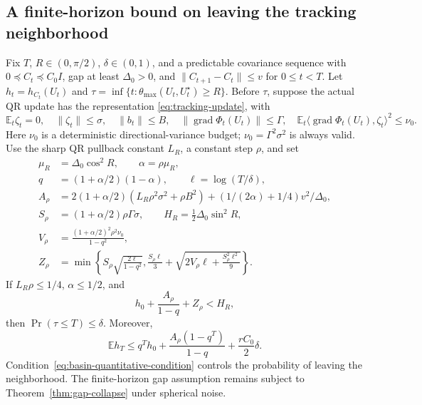 \subsection{A finite-horizon bound on leaving the tracking neighborhood}
\label{app:basin-exit}

\begin{theorem}
\label{thm:basin-certificate}
Fix $T$, $R\in(0,\pi/2)$, $\delta\in(0,1)$, and a predictable covariance sequence with
$0\preceq C_t\preceq C_0I$, gap at least $\Delta_0>0$, and
$\|C_{t+1}-C_t\|\le v$ for $0\le t<T$.
Let $h_t=h_{C_t}(U_t)$ and
$\tau=\inf\{t:\theta_{\max}(U_t,U_t^\star)\ge R\}$.
Before $\tau$, suppose the actual QR update has the representation
\eqref{eq:tracking-update}, with
\begin{equation}
 \mathbb E_t\zeta_t=0,\quad\|\zeta_t\|\le\sigma,\quad
 \|b_t\|\le B,\quad\|\operatorname{grad}\Phi_t(U_t)\|\le\Gamma,\quad
 \mathbb E_t\langle\operatorname{grad}\Phi_t(U_t),\zeta_t\rangle^2\le\nu_0.
\end{equation}
Here $\nu_0$ is a deterministic directional-variance budget;
$\nu_0=\Gamma^2\sigma^2$ is always valid.
Use the sharp QR pullback constant $L_R$, a constant step $\rho$, and set
\begin{align}
 \mu_R&=\Delta_0\cos^2R,\qquad\alpha=\rho\mu_R,\\
 q&=(1+\alpha/2)(1-\alpha),\qquad\ell=\log(T/\delta),\\
 A_\rho&=2(1+\alpha/2)(L_R\rho^2\sigma^2+\rho B^2)
                +(1/(2\alpha)+1/4)v^2/\Delta_0,\\
 S_\rho&=(1+\alpha/2)\rho\Gamma\sigma,\qquad
 H_R=\tfrac12\Delta_0\sin^2R,\\
 V_\rho&=\frac{(1+\alpha/2)^2\rho^2\nu_0}{1-q^2},\\
 Z_\rho&=\min\left\{S_\rho\sqrt{\frac{2\ell}{1-q^2}},
 \frac{S_\rho\ell}{3}+\sqrt{2V_\rho\ell+\frac{S_\rho^2\ell^2}{9}}\right\}.
\end{align}
If $L_R\rho\le1/4$, $\alpha\le1/2$, and
\begin{equation}
 h_0+\frac{A_\rho}{1-q}
  +Z_\rho<H_R,
 \label{eq:basin-quantitative-condition}
\end{equation}
then $\Pr(\tau\le T)\le\delta$. Moreover,
\begin{equation}
 \mathbb E h_T\le q^Th_0+\frac{A_\rho(1-q^T)}{1-q}
                                      +\frac{rC_0}{2}\delta.
 \label{eq:tracking-no-assumed-basin}
\end{equation}
Condition~\eqref{eq:basin-quantitative-condition} controls the probability
of leaving the neighborhood. The finite-horizon gap assumption remains
subject to Theorem~\ref{thm:gap-collapse} under spherical noise.
\end{theorem}
